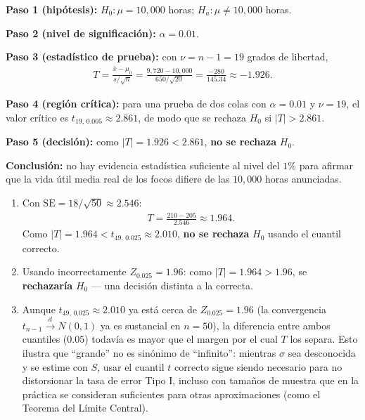 \begin{solproblema}[prob:50f5282]
	\textbf{Paso 1 (hipótesis):} $H_0: \mu = 10{,}000$ horas; $H_a: \mu \neq 10{,}000$ horas.

	\textbf{Paso 2 (nivel de significación):} $\alpha = 0.01$.

	\textbf{Paso 3 (estadístico de prueba):} con $\nu = n - 1 = 19$ grados de libertad,
	\begin{align}
		T = \frac{\bar{x} - \mu_0}{s/\sqrt{n}} = \frac{9{,}720 - 10{,}000}{650/\sqrt{20}} = \frac{-280}{145.34} \approx -1.926.
	\end{align}

	\textbf{Paso 4 (región crítica):} para una prueba de dos colas con $\alpha = 0.01$ y $\nu = 19$, el valor crítico es $t_{19,\,0.005} \approx 2.861$, de modo que se rechaza $H_0$ si $|T| > 2.861$.

	\textbf{Paso 5 (decisión):} como $|T| = 1.926 < 2.861$, \textbf{no se rechaza} $H_0$.

	\textbf{Conclusión:} no hay evidencia estadística suficiente al nivel del $1\%$ para afirmar que la vida útil media real de los focos difiere de las $10{,}000$ horas anunciadas.
\end{solproblema}

\begin{solproblema}[prob:8d10618]
	\begin{enumerate}
		\item Con $\text{SE} = 18/\sqrt{50} \approx 2.546$:
		\begin{align}
			T = \frac{210 - 205}{2.546} \approx 1.964.
		\end{align}
		Como $|T| = 1.964 < t_{49,\,0.025} \approx 2.010$, \textbf{no se rechaza} $H_0$ usando el cuantil correcto.
		\item Usando incorrectamente $Z_{0.025} = 1.96$: como $|T| = 1.964 > 1.96$, se \textbf{rechazaría} $H_0$ — una decisión distinta a la correcta.
		\item Aunque $t_{49,\,0.025} \approx 2.010$ ya está cerca de $Z_{0.025} = 1.96$ (la convergencia $t_{n-1} \xrightarrow{d} N(0,1)$ ya es sustancial en $n = 50$), la diferencia entre ambos cuantiles ($0.05$) todavía es mayor que el margen por el cual $T$ los separa. Esto ilustra que ``grande'' no es sinónimo de ``infinito'': mientras $\sigma$ sea desconocida y se estime con $S$, usar el cuantil $t$ correcto sigue siendo necesario para no distorsionar la tasa de error Tipo I, incluso con tamaños de muestra que en la práctica se consideran suficientes para otras aproximaciones (como el Teorema del Límite Central).
	\end{enumerate}
\end{solproblema}

